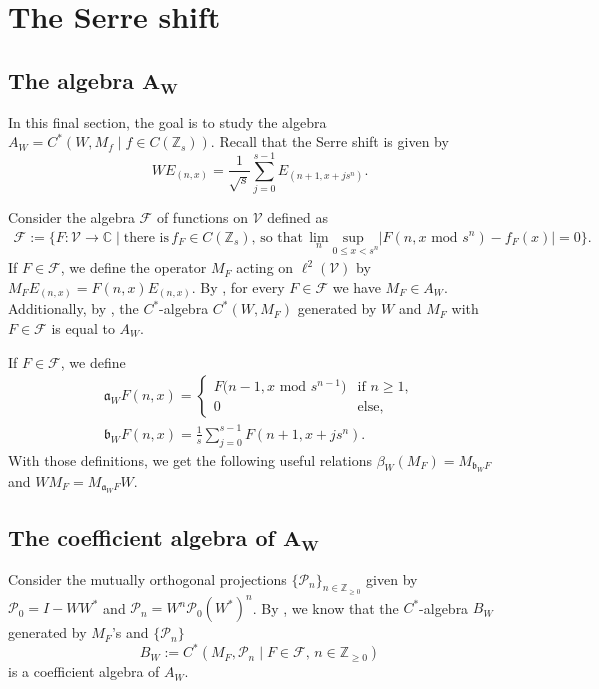 \documentclass[pdftex]{sigma}
\newcommand{\C}{{\mathbb C}}
\newcommand{\Z}{{\mathbb Z}}
\numberwithin{equation}{section}
\begin{document}
\section{The Serre shift}
\subsection[The algebra A\_W]{The algebra $\boldsymbol{A_W}$}

In this final section, the goal is to study the algebra
$A_W=C^*(W,M_f\mid f\in C(\Z_s))$.
 Recall that the Serre shift is given by
\begin{equation*}
WE_{(n,x)} = \frac{1}{\sqrt{s}}\sum_{j=0}^{s-1}E_{(n+1, x+js^n)} .
\end{equation*}

Consider the algebra $\mathcal{F}$ of functions on $\mathcal{V}$ defined as
\begin{gather*}
\mathcal{F}:=\{F\colon \mathcal{V}\to\C \mid \textrm{there is}\,f_F\in C(\Z_s), \, \textrm{so that}\,\lim_n\underset{0\le x<s^n}{\textrm{sup }}|F(n,x\textrm{ mod }s^n)-f_F(x)|=0\} .
\end{gather*}
If $F\in\mathcal{F}$, we define
 the operator $M_F$ acting on $\ell^2(\mathcal{V})$ by
$M_FE_{(n,x)}=F(n,x)E_{(n,x)}$.
By \cite[Proposition~7.2]{HKMP3}, for every $F\in\mathcal{F}$ we have $M_F\in A_W$. Additionally, by \cite[Proposition~7.3]{HKMP3}, the $C^*$-algebra $C^*(W,M_F)$ generated by $W$ and $M_F$ with $F\in\mathcal{F}$ is equal to $A_W$.

 If $F\in\mathcal{F}$, we define
\begin{gather*}
\mathfrak{a}_WF(n,x) =
\begin{cases}
F\bigl(n-1, x\textrm{ mod }s^{n-1}\bigr) &\textrm{if }n\ge1,\\
0 &\textrm{else},
\end{cases}\\
\mathfrak{b}_WF(n,x) = \frac{1}{s}\sum_{j=0}^{s-1}F(n+1, x+js^n) .
\end{gather*}
With those definitions, we get the following useful relations
$
\beta_W(M_F)=M_{\mathfrak{b}_WF}$ and $ WM_F=M_{\mathfrak{a}_WF}W$.

\subsection[The coefficient algebra of A\_W]{The coefficient algebra of $\boldsymbol{A_W}$}
Consider the mutually orthogonal projections $\{\mathcal{P}_n\}_{n\in \Z_{\ge 0}}$ given by
$\mathcal{P}_0=I-WW^*$ and $ \mathcal{P}_n = W^n\mathcal{P}_0(W^*)^{n}$.
By \cite[Proposition 7.8]{HKMP3}, we know that the $C^*$-algebra $B_W$ generated by $M_F$'s and $\{\mathcal{P}_n\}$
\begin{equation*}
B_W:=C^*(M_F,\mathcal{P}_n\mid F\in\mathcal{F}, \, n\in\Z_{\geq 0})
\end{equation*}
is a coefficient algebra of $A_W$.
\end{document}
